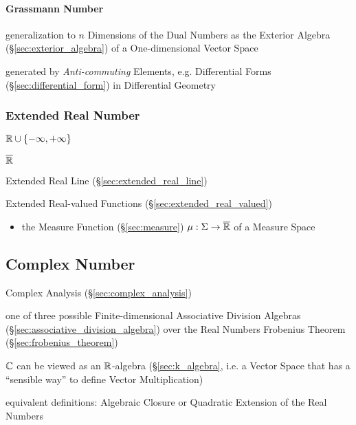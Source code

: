 \paragraph{Grassmann Number}\label{sec:grassmann_number}\hfill

generalization to $n$ Dimensions of the Dual Numbers as the Exterior Algebra
(\S\ref{sec:exterior_algebra}) of a One-dimensional Vector Space

generated by \emph{Anti-commuting} Elements, e.g. Differential Forms
(\S\ref{sec:differential_form}) in Differential Geometry



\subsubsection{Extended Real Number}\label{sec:extended_real}

$\mathbb{R} \cup \{-\infty, +\infty\}$

$\overline{\mathbb{R}}$

Extended Real Line (\S\ref{sec:extended_real_line})

Extended Real-valued Functions (\S\ref{sec:extended_real_valued})

\begin{itemize}
  \item the Measure Function (\S\ref{sec:measure}) $\mu : \Sigma \rightarrow
    \overline{\mathbb{R}}$ of a Measure Space
\end{itemize}



\subsection{Complex Number}\label{sec:complex_number}

\fist Complex Analysis (\S\ref{sec:complex_analysis})

one of three possible Finite-dimensional Associative Division Algebras
(\S\ref{sec:associative_division_algebra}) over the Real Numbers \fist
Frobenius Theorem (\S\ref{sec:frobenius_theorem})

$\mathbb{C}$ can be viewed as an $\mathbb{R}$-algebra (\S\ref{sec:k_algebra}, i.e. a
Vector Space that has a ``sensible way'' to define Vector Multiplication)

equivalent definitions: Algebraic Closure or Quadratic Extension of
the Real Numbers

